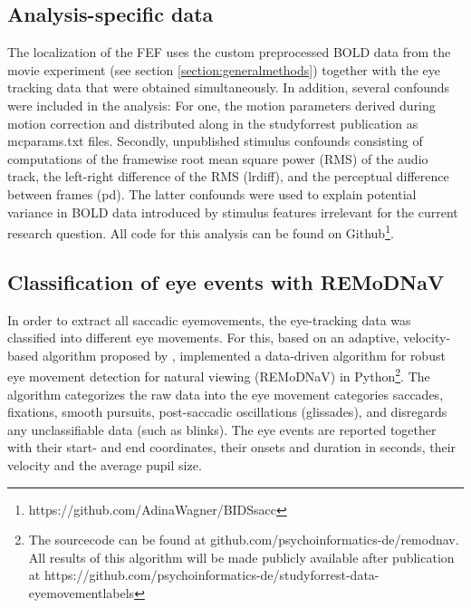 \documentclass[a4paper, 12pt]{scrreprt}
\begin{document}
\subsection{Analysis-specific data}
The localization of the FEF uses the custom preprocessed BOLD data from the movie experiment (see section \ref{section:generalmethods}) together with the eye tracking data that were obtained simultaneously. 
In addition, several confounds were included in the analysis: For one, the motion parameters derived during motion correction and distributed along in the studyforrest publication as mcparams.txt files. Secondly, unpublished stimulus confounds consisting of computations of the framewise root mean square power (RMS) of the audio track, the left-right difference of the RMS (lrdiff), and the perceptual difference between frames (pd). The latter confounds were used to explain potential variance in BOLD data introduced by stimulus features irrelevant for the current research question. All code for this analysis can be found on Github\footnote{https://github.com/AdinaWagner/BIDSsacc}.


\subsection{Classification of eye events with REMoDNaV}\label{c2:remodnav}

In order to extract all saccadic eyemovements, the eye-tracking data was classified into different eye movements. For this, based on an adaptive, velocity-based algorithm proposed by \textcite{nystrom2010adaptive}, \textcite{dar2019} implemented a data-driven algorithm for robust eye movement detection for natural viewing (REMoDNaV) in Python\footnote{The sourcecode can be found at github.com/psychoinformatics-de/remodnav. All results of this algorithm will be made publicly available after publication at https://github.com/psychoinformatics-de/studyforrest-data-eyemovementlabels}. The algorithm categorizes the raw data into the eye movement categories saccades, fixations, smooth pursuits, post-saccadic oscillations (glissades), and disregards any unclassifiable data (such as blinks). The eye events are reported together with their start- and end coordinates, their onsets and duration in seconds, their velocity and the average pupil size.
\end{document}
